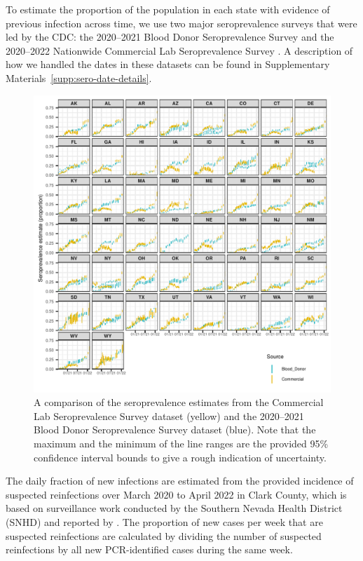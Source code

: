 \documentclass{article}
\begin{document}
To estimate the proportion of the population in each state with evidence of
previous infection across time, we use two major seroprevalence surveys that
were led by the CDC: the 2020--2021 Blood Donor Seroprevalence Survey and the
2020--2022 Nationwide Commercial Lab Seroprevalence Survey \citep{cdc2021blood,
cdc2021comm}.  A description of how we handled the dates in these datasets can be found in Supplementary Materials~\ref{supp:sero-date-details}.

\begin{figure}[!tb]
\centering
    \includegraphics[width=.99\textwidth]{sero_blood_comm_compar.pdf}
    \caption{A comparison of the seroprevalence estimates from the Commercial
    Lab Seroprevalence Survey dataset (yellow) and the 2020--2021 Blood Donor 
    Seroprevalence Survey dataset (blue). Note that the maximum and the minimum
    of the line ranges are the provided 95\% confidence interval bounds to 
    give a rough indication of uncertainty. }
    \label{fig:sero_blood_comm_compar}
\end{figure}

The daily fraction of new infections are estimated from the provided incidence
of suspected reinfections over March 2020 to April 2022 in Clark County, which
is based on surveillance work conducted by the Southern Nevada Health District
(SNHD) and reported by \citet{ruff2022rapid}. The proportion of new cases per
week that are suspected reinfections are calculated by dividing the number of
suspected reinfections by all new PCR-identified cases during the same week. 
\end{document}
